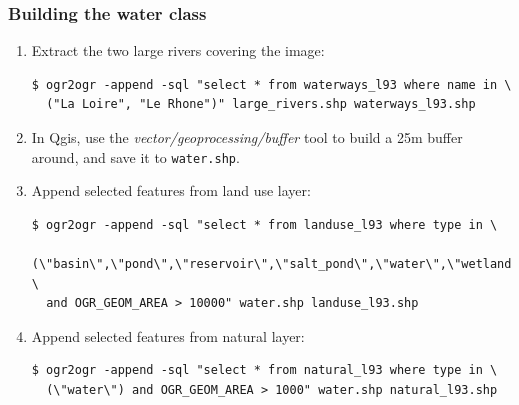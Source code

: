 \documentclass[8pt]{beamer}
\begin{document}
\begin{frame}[fragile]
\frametitle{Building the water class}
\begin{enumerate}
\item Extract the two large rivers covering the image:
\begin{scriptsize}
\begin{verbatim}
$ ogr2ogr -append -sql "select * from waterways_l93 where name in \
  ("La Loire", "Le Rhone")" large_rivers.shp waterways_l93.shp
\end{verbatim}
\end{scriptsize}

\item In Qgis, use the \textit{vector/geoprocessing/buffer} tool to build a 25m buffer around, and save it to \texttt{water.shp}.

\item Append selected features from land use layer:
\begin{scriptsize}
\begin{verbatim}
$ ogr2ogr -append -sql "select * from landuse_l93 where type in \ 
  (\"basin\",\"pond\",\"reservoir\",\"salt_pond\",\"water\",\"wetland\") \
  and OGR_GEOM_AREA > 10000" water.shp landuse_l93.shp
\end{verbatim}
\end{scriptsize}

\item Append selected features from natural layer:
\begin{scriptsize}
\begin{verbatim}
$ ogr2ogr -append -sql "select * from natural_l93 where type in \
  (\"water\") and OGR_GEOM_AREA > 1000" water.shp natural_l93.shp
\end{verbatim}
\end{scriptsize}
\end{enumerate}
\end{frame}
\end{document}
